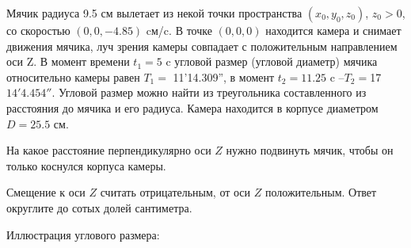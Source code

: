 
Мячик радиуса 9.5 см вылетает из некой точки пространства $(x_0, y_0, z_0)$, $ z_0 > 0 $, со скоростью $(0, 0, -4.85)$ cм/c. В точке $(0, 0, 0)$ находится камера и снимает движения мячика, луч зрения камеры совпадает с положительным направлением оси Z. В момент времени $t_1 = 5$ c угловой размер (угловой диаметр) мячика относительно камеры равен $T_1=$ 11'14.309'', в момент $t_2=11.25$ c –$T_2=$17\textdegree $14'4.454''$. Угловой размер можно найти из треугольника составленного из расстояния до мячика и его радиуса. Камера находится в корпусе диаметром $D = 25.5$ см. 

На какое расстояние перпендикулярно оси $Z$ нужно подвинуть мячик, чтобы он только коснулся корпуса камеры. 

Смещение к оси $Z$ считать отрицательным, от оси $Z$ положительным. 
Ответ округлите до сотых долей сантиметра.


Иллюстрация углового размера:


